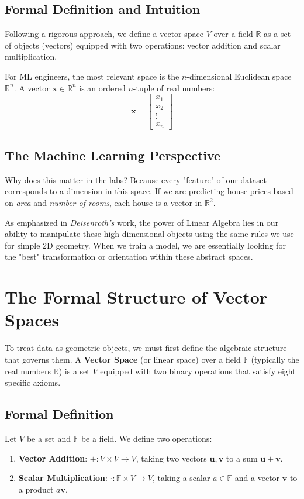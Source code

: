 \documentclass[12pt,a4paper,twoside,openright]{book}
\begin{document}
\subsection{Formal Definition and Intuition}
Following a rigorous approach, we define a vector space $V$ over a field $\mathbb{R}$ as a set of objects (vectors) equipped with two operations: vector addition and scalar multiplication. 

For ML engineers, the most relevant space is the $n$-dimensional Euclidean space $\mathbb{R}^n$. A vector $\mathbf{x} \in \mathbb{R}^n$ is an ordered $n$-tuple of real numbers:
$$ \mathbf{x} = \begin{bmatrix} x_1 \\ x_2 \\ \vdots \\ x_n \end{bmatrix} $$

\subsection{The Machine Learning Perspective}
Why does this matter in the labs? Because every "feature" of our dataset corresponds to a dimension in this space. If we are predicting house prices based on \textit{area} and \textit{number of rooms}, each house is a vector in $\mathbb{R}^2$. 

As emphasized in \textit{Deisenroth's} work, the power of Linear Algebra lies in our ability to manipulate these high-dimensional objects using the same rules we use for simple 2D geometry. When we train a model, we are essentially looking for the "best" transformation or orientation within these abstract spaces.

\section{The Formal Structure of Vector Spaces}

To treat data as geometric objects, we must first define the algebraic structure that governs them. A \textbf{Vector Space} (or linear space) over a field $\mathbb{F}$ (typically the real numbers $\mathbb{R}$) is a set $V$ equipped with two binary operations that satisfy eight specific axioms.

\subsection{Formal Definition}
Let $V$ be a set and $\mathbb{F}$ be a field. We define two operations:
\begin{enumerate}
    \item \textbf{Vector Addition}: $+: V \times V \to V$, taking two vectors $\mathbf{u}, \mathbf{v}$ to a sum $\mathbf{u} + \mathbf{v}$.
    \item \textbf{Scalar Multiplication}: $\cdot: \mathbb{F} \times V \to V$, taking a scalar $a \in \mathbb{F}$ and a vector $\mathbf{v}$ to a product $a\mathbf{v}$.
\end{enumerate}
\end{document}

